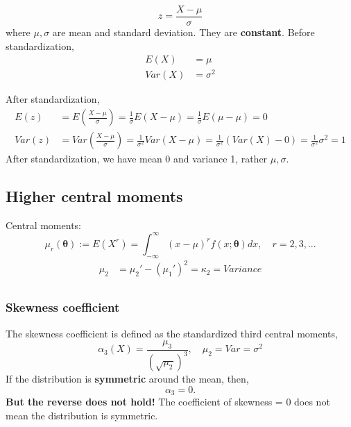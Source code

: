 \documentclass[12pt]{article}
\begin{document}
\begin{equation*}
z = \frac{X - \mu}{\sigma}
\end{equation*}
where $ \mu , \sigma $ are mean and standard deviation. They are {\textbf {constant}}.
Before standardization, 
\begin{align*}
E(X) &= \mu\\
Var(X) &= \sigma^{2}
\end{align*}

After standardization,
\begin{align*}
E(z) &= E \left( \frac{X - \mu}{\sigma} \right)  = \frac{1}{\sigma}E(X - \mu) = \frac{1}{\sigma}
E(\mu - \mu) = 0\\
Var(z)&= Var \left( \frac{X - \mu}{\sigma} \right) = \frac{1}{\sigma^{2}}Var(X - \mu)=
\frac{1}{\sigma^{2}}(Var(X) - 0) = \frac{1}{\sigma^{2}}\sigma^{2} = 1
\end{align*}
After standardization, we have mean 0 and variance 1, rather $ \mu, \sigma $.



\subsection{Higher central moments}

Central moments:
\begin{equation*}
\mu_{r}(\bm{\theta}):=E(X^{r}) = \int_{ - \infty }^{\infty } (x - \mu)^{r}f(x;
\bm{\theta})dx, \quad r = 2,3,...
\end{equation*}
\begin{align*}
\mu_2 &= \mu_2' - (\mu_1')^{2} = \kappa_2 = Variance\\
\end{align*}

\subsubsection{Skewness coefficient}
The skewness coefficient is defined as the standardized third central moments,
\begin{equation*}
\alpha_3(X) = \frac{\mu_3}{(\sqrt {\mu_2})^{3}},\quad \mu_2 = Var = \sigma^{2}
\end{equation*}
If the distribution is {\textbf {symmetric}} around the mean, then,
\begin{equation*}
\alpha_3 = 0.
\end{equation*}
{\textbf {But the reverse does not hold!}} The coefficient of skewness = 0 does not mean
the distribution is symmetric.
\end{document}
